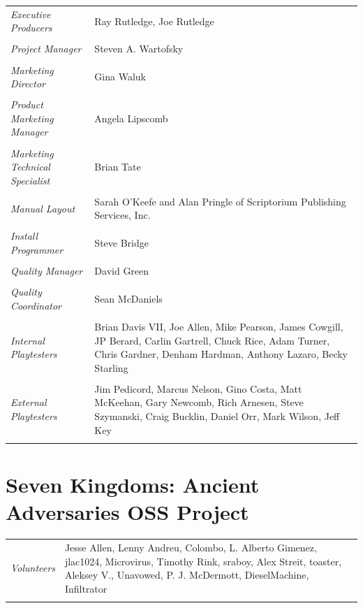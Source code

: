 \begin{tabular}{p{1in} p{3in}}
    \textit{Executive Producers} & Ray Rutledge, Joe Rutledge \\ \\
    \textit{Project Manager} & Steven A. Wartofsky \\ \\
    \textit{Marketing Director} & Gina Waluk \\ \\
    \textit{Product Marketing Manager} & Angela Lipscomb \\ \\
    \textit{Marketing Technical Specialist}    & Brian Tate \\ \\
    \textit{Manual Layout} & Sarah O’Keefe and Alan Pringle of Scriptorium Publishing Services, Inc. \\ \\
    \textit{Install Programmer}    & Steve Bridge \\ \\
    \textit{Quality Manager} & David Green \\ \\
    \textit{Quality Coordinator} & Sean McDaniels \\ \\
    \textit{Internal Playtesters} & Brian Davis VII, Joe Allen, Mike Pearson, James Cowgill, JP Berard, Carlin Gartrell, Chuck Rice, Adam Turner, Chris Gardner, Denham Hardman, Anthony Lazaro, Becky Starling \\ \\
    \textit{External Playtesters} & Jim Pedicord, Marcus Nelson, Gino Costa, Matt McKeehan, Gary Newcomb, Rich Arnesen, Steve Szymanski, Craig Bucklin, Daniel Orr, Mark Wilson, Jeff Key \\ \\
\end{tabular}

\clearpage

\section{Seven Kingdoms: Ancient Adversaries OSS Project}


\begin{tabular}{p{1in} p{3in}}
    \textit{Volunteers} & Jesse Allen, Lenny Andreu, Colombo, L. Alberto Gimenez, jlac1024, Microvirus, Timothy Rink, sraboy, Alex Streit, toaster, Aleksey V., Unavowed, P. J. McDermott, DieselMachine, Infiltrator \\ \\
\end{tabular}
